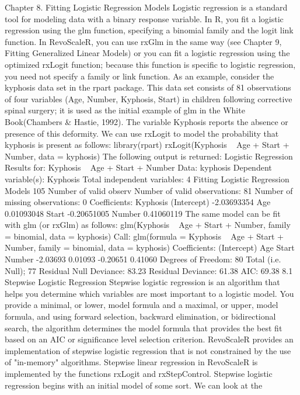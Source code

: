 Chapter 8.
Fitting Logistic Regression
Models
Logistic regression is a standard tool for modeling data with a binary response variable. In R,
you fit a logistic regression using the glm function, specifying a binomial family and the logit link
function. In RevoScaleR, you can use rxGlm in the same way (see Chapter 9, Fitting Generalized
Linear Models) or you can fit a logistic regression using the optimized rxLogit function;
because this function is specific to logistic regression, you need not specify a family or link
function.
As an example, consider the kyphosis data set in the rpart package. This data set consists of
81 observations of four variables (Age, Number, Kyphosis, Start) in children following corrective
spinal surgery; it is used as the initial example of glm in the White Book(Chambers & Hastie,
1992). The variable Kyphosis reports the absence or presence of this deformity.
We can use rxLogit to model the probability that kyphosis is present as follows:
library(rpart)
rxLogit(Kyphosis ~ Age + Start + Number, data = kyphosis)
The following output is returned:
Logistic Regression Results for: Kyphosis ~ Age + Start + Number
Data: kyphosis
Dependent variable(s): Kyphosis
Total independent variables: 4 
Fitting Logistic Regression Models 105
Number of valid observ
Number of valid observations: 81
Number of missing observations: 0
Coefficients:
 Kyphosis
(Intercept) -2.03693354
Age 0.01093048
Start -0.20651005
Number 0.41060119
The same model can be fit with glm (or rxGlm) as follows:
glm(Kyphosis ~ Age + Start + Number, family = binomial, data = kyphosis)
Call: glm(formula = Kyphosis ~ Age + Start + Number, family = binomial,
data = kyphosis)
Coefficients:
(Intercept) Age Start Number
 -2.03693 0.01093 -0.20651 0.41060
Degrees of Freedom: 80 Total (i.e. Null); 77 Residual
Null Deviance: 83.23
Residual Deviance: 61.38 AIC: 69.38
8.1 Stepwise Logistic Regression
Stepwise logistic regression is an algorithm that helps you determine which variables are most
important to a logistic model. You provide a minimal, or lower, model formula and a maximal,
or upper, model formula, and using forward selection, backward elimination, or bidirectional
search, the algorithm determines the model formula that provides the best fit based on an AIC
or significance level selection criterion.
RevoScaleR provides an implementation of stepwise logistic regression that is not constrained
by the use of "in-memory" algorithms. Stepwise linear regression in RevoScaleR is implemented
by the functions rxLogit and rxStepControl.
Stepwise logistic regression begins with an initial model of some sort. We can look at the
